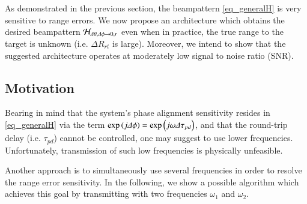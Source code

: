As demonstrated in the previous section, the beampattern \eqref{eq_generalH} is very sensitive to range errors.
We now propose an architecture which obtains the desired beampattern $\mathcal{H}_{\Delta\theta,\Delta\phi\to0,r}$ even when in practice, the true range to the target is unknown (i.e. $\Delta R_{rt}$ is large). Moreover, we intend to show that the suggested architecture operates at moderately low signal to noise ratio (SNR).

\subsection*{Motivation}
Bearing in mind that the system's phase alignment sensitivity resides in \eqref{eq_generalH} via the  term $\exp\left({j\Delta\phi}\right)=\exp\left({j\omega\Delta\tau_{pd}}\right)$, and that the round-trip delay (i.e. $\tau_{pd}$) cannot be controlled, one may suggest to use lower frequencies. Unfortunately, transmission of such low frequencies is physically unfeasible. 
\par Another approach is to simultaneously use several frequencies in order to resolve the range error sensitivity. In the following, we show a possible algorithm which achieves this goal by transmitting with two frequencies $\omega_1$ and $\omega_2$.

